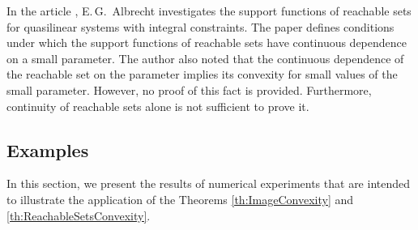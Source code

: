 \documentclass[../main.tex]{subfiles}
\begin{document}
\begin{zam}  
	In the article \cite{Albrecht2}, E.\,G.~Albrecht investigates the support functions of reachable sets for quasilinear systems with integral constraints. The paper defines conditions under which the support functions of reachable sets have continuous dependence on a small parameter.  The author also noted that the continuous dependence of the reachable set on the parameter implies its convexity for small values of the small parameter. However, no proof of this fact is provided. Furthermore, continuity of reachable sets alone is not sufficient to prove it.
\end{zam}

\subsection{Examples}
\setcounter{equation}{0}

In this section, we  present the results of numerical experiments that are intended to illustrate the application of the Theorems \ref{th:ImageConvexity} and \ref{th:ReachableSetsConvexity}. 
\end{document}
